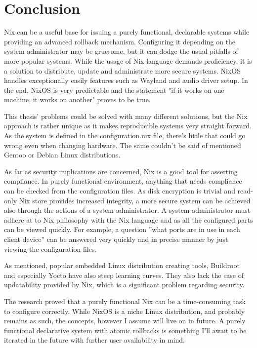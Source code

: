 \chapter{Conclusion} \label{conclusion}

Nix can be a useful base for issuing a purely functional, declarable
systems while providing an advanced rollback mechanism. Configuring
it depending on the system administrator may be gruesome, but it can
dodge the usual pitfalls of more popular systems. While the usage of
Nix language demands proficiency, it is a solution to
distribute, update and administrate more secure systems. NixOS handles
exceptionally easily features such as Wayland and audio driver
setup. In the end, NixOS is very predictable and the statement "if it
works on one machine, it works on another" proves to be true.

This thesis' problems could be solved with many different solutions,
but the Nix approach is rather unique as it makes reproducible
systems very straight forward. As the system is defined in the
configuration.nix file, there's little that could go wrong even when
changing hardware. The same couldn't be said of mentioned Gentoo or
Debian Linux distributions.

As far as security implications are concerned, Nix is a good tool
for asserting compliance. In purely functional environment, anything
that needs compliance can be checked from the configuration files. As
disk encryption is trivial and read-only Nix store provides increased
integrity, a more secure system can be achieved also through the
actions of a system administrator. A system administrator must adhere
at to Nix philosophy with the Nix language and as all the configured
parts can be viewed quickly. For example, a question ''what ports are in
use in each client device'' can be answered very quickly and in
precise manner by just viewing the configuration files.

As mentioned, popular embedded Linux distribution creating tools,
Buildroot and especially Yocto have also steep learning curves. They
also lack the ease of updatability provided by Nix, which is a
significant problem regarding security.

The research proved that a purely functional Nix can be a
time-consuming task to configure correctly. While NixOS is a niche
Linux distribution, and probably remains as such, the concepts,
however I assume will live on in future. A purely functional
declarative system with atomic rollbacks is something I'll await to be
iterated in the future with further user availability in mind.
